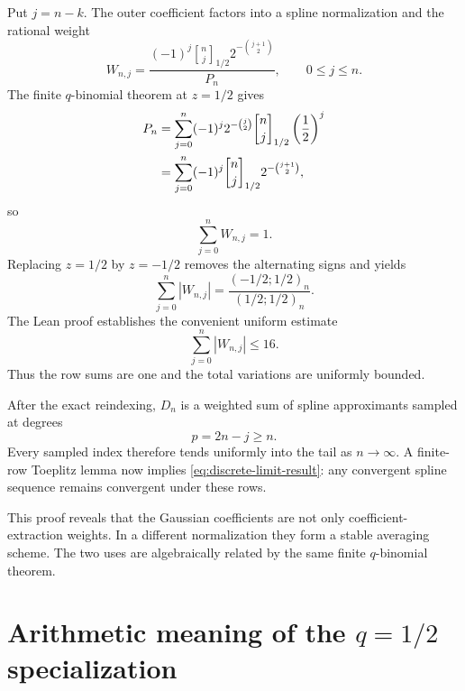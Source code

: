 \documentclass[11pt]{article}
\theoremstyle{definition}
\newcommand{\qpoch}[3]{\left(#1;#2\right)_{#3}}
\newcommand{\Qbin}[3]{\genfrac{[}{]}{0pt}{}{#1}{#2}_{#3}}
\begin{document}
Put $j=n-k$.  The outer coefficient factors into a spline normalization and the rational weight
\begin{equation}
  W_{n,j}
  =\frac{(-1)^j\Qbin{n}{j}{1/2}
          2^{-\binom{j+1}{2}}}{P_n},
  \qquad 0\le j\le n.
  \label{eq:Toeplitz-weight}
\end{equation}
The finite $q$-binomial theorem at $z=1/2$ gives
\begin{align}
  P_n
  &=\sum_{j=0}^{n}(-1)^j2^{-\binom{j}{2}}
    \Qbin{n}{j}{1/2}\left(\frac12\right)^j\notag\\
  &=\sum_{j=0}^{n}(-1)^j\Qbin{n}{j}{1/2}
    2^{-\binom{j+1}{2}},
  \label{eq:Toeplitz-row-sum-proof}
\end{align}
so
\begin{equation}
  \sum_{j=0}^{n}W_{n,j}=1.
  \label{eq:Toeplitz-row-sum}
\end{equation}
Replacing $z=1/2$ by $z=-1/2$ removes the alternating signs and yields
\begin{equation}
  \sum_{j=0}^{n}|W_{n,j}|
  =\frac{\qpoch{-1/2}{1/2}{n}}{\qpoch{1/2}{1/2}{n}}.
  \label{eq:Toeplitz-variation-exact}
\end{equation}
The Lean proof establishes the convenient uniform estimate
\begin{equation}
  \sum_{j=0}^{n}|W_{n,j}|\le16.
  \label{eq:Toeplitz-variation-bound}
\end{equation}
Thus the row sums are one and the total variations are uniformly bounded.

After the exact reindexing, $D_n$ is a weighted sum of spline approximants sampled at degrees
\begin{equation}
  p=2n-j\ge n.
  \label{eq:Toeplitz-index}
\end{equation}
Every sampled index therefore tends uniformly into the tail as $n\to\infty$.  A finite-row Toeplitz lemma now implies \cref{eq:discrete-limit-result}: any convergent spline sequence remains convergent under these rows.

This proof reveals that the Gaussian coefficients are not only coefficient-extraction weights.  In a different normalization they form a stable averaging scheme.  The two uses are algebraically related by the same finite $q$-binomial theorem.

\section{Arithmetic meaning of the \texorpdfstring{$q=1/2$}{q=1/2} specialization}
\label{sec:arithmetic}
\end{document}
